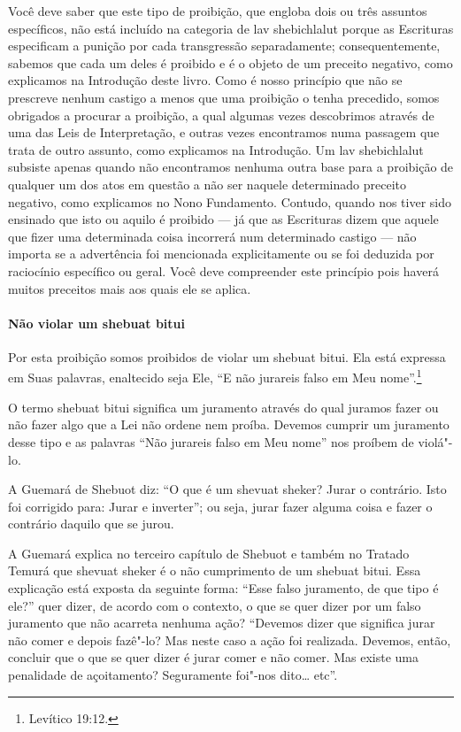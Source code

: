 \begin{multicols}{2}
Você deve saber que este tipo de proibição, que engloba dois ou três
assuntos específicos, não está incluído na categoria de lav shebichlalut\starr{} porque as Escrituras especificam a punição por cada
transgressão separadamente; consequentemente, sabemos que cada um deles
é proibido e é o objeto de um preceito negativo, como explicamos na
Introdução deste livro. Como é nosso princípio que não se prescreve
nenhum castigo a menos que uma proibição o tenha precedido, somos
obrigados a procurar a proibição, a qual algumas vezes descobrimos
através de uma das Leis de Interpretação, e outras vezes encontramos
numa passagem que trata de outro assunto, como explicamos na
Introdução. Um lav shebichlalut\starr{} subsiste apenas quando não
encontramos nenhuma outra base para a proibição de qualquer um dos atos
em questão a não ser naquele determinado preceito negativo, como
explicamos no Nono Fundamento. Contudo, quando nos tiver sido ensinado
que isto ou aquilo é proibido --- já que as Escrituras dizem que aquele
que fizer uma determinada coisa incorrerá num determinado castigo ---
não importa se a advertência foi mencionada explicitamente ou se foi
deduzida por raciocínio específico ou geral. Você deve compreender este
princípio pois haverá muitos preceitos mais aos quais ele se aplica.

\paragraph{Não violar um shebuat bitui\starr}

Por esta proibição somos proibidos de violar um shebuat bitui\starr. Ela
está expressa em Suas palavras, enaltecido seja Ele, ``E não jurareis
falso em Meu nome''.\footnote{Levítico 19:12.}

O termo shebuat bitui\starr{} significa um juramento através do qual juramos
fazer ou não fazer algo que a Lei não ordene nem proíba. Devemos
cumprir um juramento desse tipo e as palavras ``Não jurareis falso em
Meu nome'' nos proíbem de violá"-lo.

A Guemará\starr{} de Shebuot\starr{} diz: ``O que é um shevuat sheker\starr? Jurar o
contrário. Isto foi corrigido para: Jurar e inverter''; ou seja, jurar
fazer alguma coisa e fazer o contrário daquilo que se jurou.

A Guemará\starr{} explica no terceiro capítulo de Shebuot\starr{} e também no Tratado
Temurá\starr{} que shevuat sheker\starr{} é o não cumprimento
de um shebuat bitui\starr. Essa explicação está exposta da seguinte forma:
``Esse falso juramento, de que tipo é ele?'' quer dizer, de acordo com o
contexto, o que se quer dizer por um falso juramento que não acarreta
nenhuma ação? ``Devemos dizer que significa jurar não comer e depois
fazê"-lo? Mas neste caso a ação foi realizada. Devemos, então, concluir
que o que se quer dizer é jurar comer e não comer. Mas existe uma
penalidade de açoitamento? Seguramente foi"-nos dito\ldots{} etc''.


\end{multicols}
